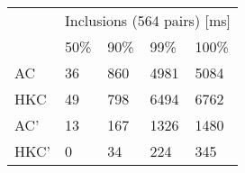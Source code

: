 \begin{tabular}{l|llll|}
\multirow{2}{*}{} & \multicolumn{4}{l|}{Inclusions (564 pairs) {[}ms{]}} \\ \cline{2-5}
                  & 50\%      & 90\%      & 99\%     & 100\%    \\ \hline
AC                & 36     & 860     & 4981    & 5084    \\
HKC               & 49     & 798     & 6494    & 6762    \\
AC'               & 13     & 167     & 1326    & 1480    \\
HKC'              & 0      & 34      & 224     & 345
\end{tabular}
